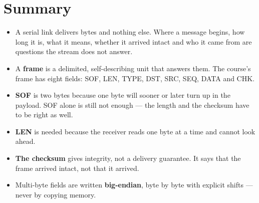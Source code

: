 \section*{Summary}

\begin{itemize}
  \item A serial link delivers bytes and nothing else. Where a message begins, how long it is,
    what it means, whether it arrived intact and who it came from are questions the stream does
    not answer.
  \item A \textbf{frame} is a delimited, self-describing unit that answers them. The course's
    frame has eight fields: SOF, LEN, TYPE, DST, SRC, SEQ, DATA and CHK.
  \item \textbf{SOF} is two bytes because one byte will sooner or later turn up in the payload.
    SOF alone is still not enough --- the length and the checksum have to be right as well.
  \item \textbf{LEN} is needed because the receiver reads one byte at a time and cannot look
    ahead.
  \item \textbf{The checksum} gives integrity, not a delivery guarantee. It says that the frame
    arrived intact, not that it arrived.
  \item Multi-byte fields are written \textbf{big-endian}, byte by byte with explicit shifts ---
    never by copying memory.
\end{itemize}
